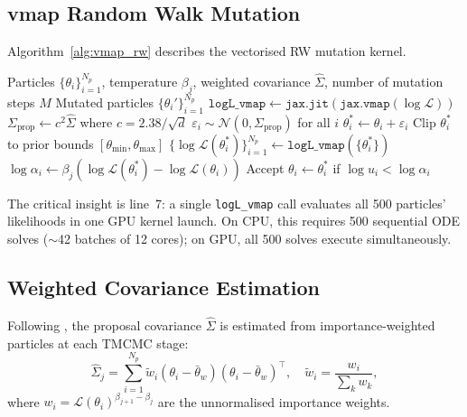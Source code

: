 \documentclass[11pt,a4paper]{article}
\begin{document}
\subsection{vmap Random Walk Mutation}

Algorithm~\ref{alg:vmap_rw} describes the vectorised RW mutation kernel.

\begin{algorithm}[htbp]
\caption{vmap Random Walk mutation for GPU TMCMC}
\label{alg:vmap_rw}
\begin{algorithmic}[1]
\REQUIRE Particles $\{\theta_i\}_{i=1}^{N_p}$, temperature $\beta_j$,
  weighted covariance $\hat{\Sigma}$, number of mutation steps $M$
\ENSURE Mutated particles $\{\theta_i'\}_{i=1}^{N_p}$
\STATE $\texttt{logL\_vmap} \gets \texttt{jax.jit}(\texttt{jax.vmap}(\log\mathcal{L}))$
\STATE $\Sigma_\text{prop} \gets c^2 \hat{\Sigma}$ where $c = 2.38 / \sqrt{d}$
  \STATE $\varepsilon_i \sim \mathcal{N}(0, \Sigma_\text{prop})$ for all $i$
  \STATE $\theta_i^* \gets \theta_i + \varepsilon_i$
  \STATE Clip $\theta_i^*$ to prior bounds $[\theta_{\min}, \theta_{\max}]$
  \STATE $\{\log\mathcal{L}(\theta_i^*)\}_{i=1}^{N_p} \gets \texttt{logL\_vmap}(\{\theta_i^*\})$
  \STATE $\log\alpha_i \gets \beta_j (\log\mathcal{L}(\theta_i^*) - \log\mathcal{L}(\theta_i))$
  \STATE Accept $\theta_i \gets \theta_i^*$ if $\log u_i < \log\alpha_i$
\ENDFOR
\end{algorithmic}
\end{algorithm}

The critical insight is line~7: a single \texttt{logL\_vmap} call evaluates
all 500 particles' likelihoods in one GPU kernel launch.  On CPU, this
requires 500 sequential ODE solves ($\sim$42 batches of 12 cores);
on GPU, all 500 solves execute simultaneously.

\subsection{Weighted Covariance Estimation}

Following \cite{Betz2016}, the proposal covariance $\hat{\Sigma}$ is
estimated from importance-weighted particles at each TMCMC stage:
\begin{equation}
  \hat{\Sigma}_j = \sum_{i=1}^{N_p} \tilde{w}_i
    (\theta_i - \bar{\theta}_w)(\theta_i - \bar{\theta}_w)^\top,
  \quad
  \tilde{w}_i = \frac{w_i}{\sum_k w_k},
  \label{eq:weighted_cov}
\end{equation}
where $w_i = \mathcal{L}(\theta_i)^{\beta_{j+1} - \beta_j}$ are the
unnormalised importance weights.
\end{document}
